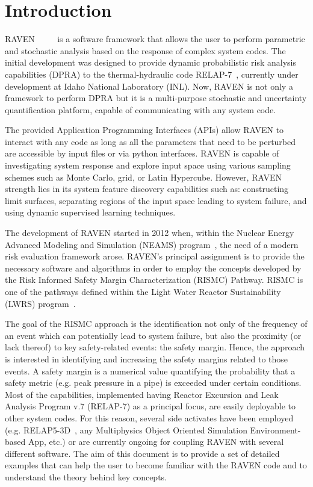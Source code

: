 \section{Introduction}
RAVEN~\cite{alfonsiMC} ~\cite{alfonsiPSA}~\cite{RAVENFY13}~\cite{ESREL2014} is a software framework that allows the user to perform parametric and stochastic
analysis based on the response of complex system codes.
The initial development was designed to provide dynamic probabilistic risk analysis
capabilities (DPRA) to the thermal-hydraulic code RELAP-7~\cite{relap7FY12}, currently under development
at Idaho National Laboratory (INL).
Now, RAVEN is not only a framework to perform DPRA but it is a
multi-purpose stochastic and uncertainty quantification platform, capable of communicating with any system code.

The provided Application Programming
Interfaces (APIs) allow RAVEN to interact with any code as long as all the parameters
that need to be perturbed are accessible by input files or via python
interfaces.
RAVEN is capable of investigating system response and explore input space using various
sampling schemes such as Monte Carlo, grid, or Latin Hypercube.
However, RAVEN strength lies in its system feature discovery capabilities such as: constructing
limit surfaces, separating regions of the input space leading to system failure,
and using dynamic supervised learning techniques.

The development of RAVEN started in 2012 when, within the Nuclear Energy
Advanced Modeling and Simulation (NEAMS) program~\cite{neams}, the need of a modern
risk evaluation framework arose.
RAVEN's principal assignment is to provide the necessary software and algorithms
in order to employ the concepts developed by the Risk Informed Safety Margin
Characterization (RISMC) Pathway.
RISMC is one of the pathways defined within the Light Water Reactor
Sustainability (LWRS) program~\cite{lwrs}.

The goal of the RISMC approach is  the identification not only of the frequency of an
event which can potentially lead to system failure, but also the proximity (or lack
thereof) to key safety-related events: the safety margin.
Hence, the approach is interested in identifying and increasing the safety
margins related to those events.
A safety margin is a numerical value quantifying the probability that a safety
metric (e.g. peak pressure in a pipe) is exceeded under certain conditions.
Most of the capabilities, implemented having Reactor Excursion and Leak Analysis Program v.7 
(RELAP-7) as a principal focus, are
easily deployable to other system codes.
%
For this reason, several side activates have been employed (e.g.  RELAP5-3D~\cite{RELAP5userManual}, any Multiphysics Object Oriented 
Simulation Environment-based App, etc.)
or are currently ongoing for coupling RAVEN with several different software.
%
The aim of this document is to provide a set of detailed examples that can help the user to become familiar with the RAVEN code and to understand the theory behind key concepts.
